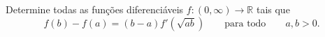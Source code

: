 Determine todas as funções diferenciáveis \(f\colon (0,\infty) \to \mathbb{R}\) tais que
\[f(b)-f(a)=(b-a)f'(\sqrt{ab}) \qquad \text{para todo}\qquad a,b>0.\]
